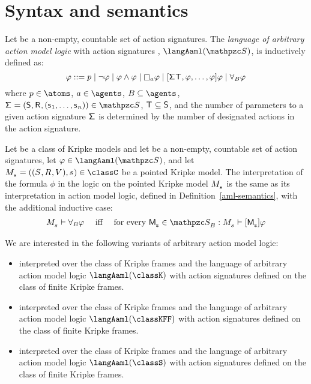 \section{Syntax and semantics}

\begin{definition}
Let \aSignatureFamily{} be a non-empty, countable set of action signatures.
The {\em language of arbitrary action model logic} with action signatures \aSignatureFamily{}, $\langAaml(\aSignatureFamily)$, is inductively defined as:
$$
\phi ::= 
    \atomP \mid
    \lnot \phi \mid
    \phi \land \phi \mid
    \necessaryA \phi \mid
    \actionA{\aSignature \aStatesT, \phi, \dots, \phi} \phi \mid
    \allactsBs \phi
$$
where $\atomP \in \atoms$, $\agentA \in \agents$, $\agentsB \subseteq \agents$, $\aSignatureAndTuple \in \aSignatureFamily$, $\aStatesT \subseteq \aStates$, and the number of parameters to a given action signature $\aSignature$ is determined by the number of designated actions in the action signature.
\end{definition}

\begin{definition}
Let \classC{} be a class of Kripke models and let \aSignatureFamily{} be a non-empty, countable set of action signatures, let $\phi \in \langAaml(\aSignatureFamily)$, and let $\kPModelAndTuple{\kStateS} \in \classC$ be a pointed Kripke model.
The interpretation of the formula $\phi$ in the logic \logicAamlC{} on the pointed Kripke model $\kPModel{\kStateS}$ is the same as its interpretation in action model logic, defined in Definition~\ref{aml-semantics}, with the additional inductive case:
$$
\begin{array}{lcl}
    \kPModel{\kStateS} \entails \allactsBs \phi & \text{ iff } & \text{for every } \aPModel{\aStateS} \in \aSignatureFamily_\agentsB : \kPModel{\kStateS} \entails \actionA{\aPModel{\aStateS}} \phi
\end{array}
$$
\end{definition}

We are interested in the following variants of arbitrary action model logic:
\begin{itemize}
    \item \logicAamlK{} interpreted over the class of \classK{} Kripke frames and the language of arbitrary action model logic $\langAaml(\classK)$ with action signatures defined on the class of finite \classK{} Kripke frames.
    \item \logicAamlKFF{} interpreted over the class of \classKFF{} Kripke frames and the language of arbitrary action model logic $\langAaml(\classKFF)$ with action signatures defined on the class of finite \classKFF{} Kripke frames.
    \item \logicAamlS{} interpreted over the class of \classS{} Kripke frames and the language of arbitrary action model logic $\langAaml(\classS)$ with action signatures defined on the class of finite \classS{} Kripke frames.
\end{itemize}

